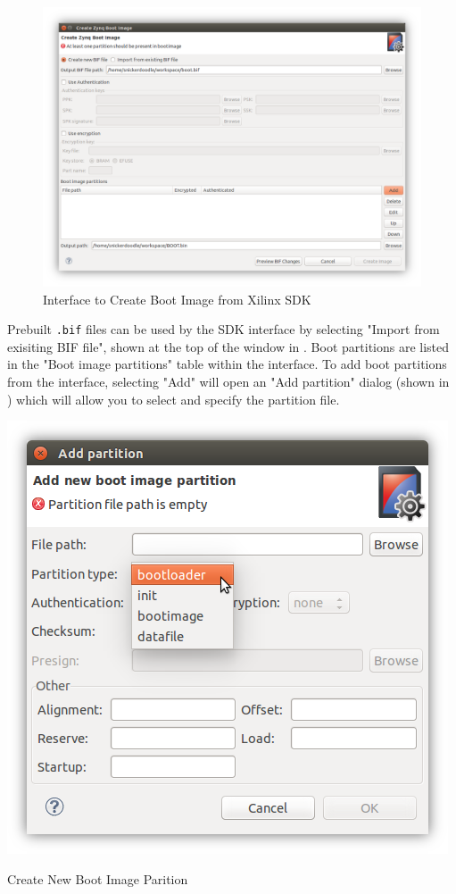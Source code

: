 \begin{figure}
	\centering
	\includegraphics{images/Create_Boot_Image.png}
	\caption{Interface to Create Boot Image from Xilinx SDK}
	\label{fig:createbootimage}
\end{figure}

\noindent
Prebuilt \texttt{.bif} files can be used by the SDK interface by selecting "Import from exisiting BIF file", shown at the top of the window in . Boot partitions are listed in the "Boot image partitions" table within the interface. To add boot partitions from the interface, selecting "Add" will open an "Add partition" dialog (shown in ) which will allow you to select and specify the partition file. \\ 


\begin{marginfigure}
	\centering
	\includegraphics{images/New_Boot_Image_Partition.png}
	\caption[Create New Boot Image Parition]{Create New Boot Image Parition}
	\label{fig:bootimagepartition}
\end{marginfigure}

